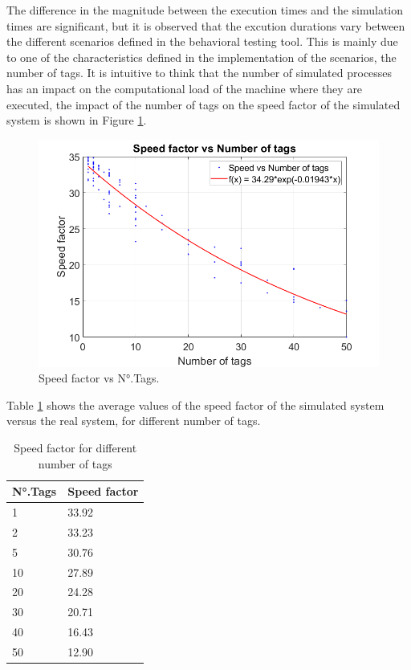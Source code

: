 \documentclass[journal]{IEEEtran}	%
\begin{document}
The difference in the magnitude between the execution times and the simulation times are significant, but it is observed that the excution durations vary between the different scenarios defined in the behavioral testing tool. This is mainly due to one of the characteristics defined in the implementation of the scenarios, the number of tags. It is intuitive to think that the number of simulated processes has an impact on the computational load of the machine where they are executed, the impact of the number of tags on the speed factor of the simulated system is shown in Figure \ref{fig:speed}.

\begin{figure}[t]
\centering
\includegraphics[width=0.95\columnwidth]{speedFactor2.png}
\caption{Speed factor vs N°.Tags.}
\label{fig:speed}
\end{figure}

Table \ref{tab:speed} shows the average values of the speed factor of the simulated system versus the real system, for different number of tags. 

\begin{table}[H]
    \renewcommand{\arraystretch}{1.25}		%
    \centering
    \caption{Speed factor for different number of tags}	%
    \label{tab:speed}
    \begin{tabular}{l|l}					%
    \hline \hline
    \textbf{N°.Tags}        &    \textbf{Speed factor}\\
    \hline
    1       &   33.92\\
    2       &   33.23\\
    5       &   30.76\\
    10      &   27.89\\
    20      &   24.28\\
    30      &   20.71\\
    40      &   16.43\\
    50      &   12.90\\
    \hline \hline
    \end{tabular}
\end{table}
\end{document}
